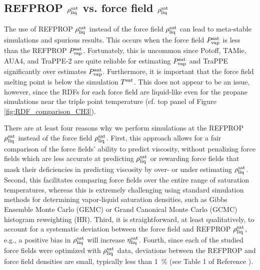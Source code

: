 \documentclass[preprint,review,12pt]{elsarticle}
\begin{document}
	\subsection{REFPROP $\rho_{\rm liq}^{\rm sat}$ vs. force field $\rho_{\rm liq}^{\rm sat}$}
	
	The use of REFPROP $\rho_{\rm liq}^{\rm sat}$ instead of the force field $\rho_{\rm liq}^{\rm sat}$ can lead to meta-stable simulations and spurious results. This occurs when the force field $P_{\rm vap}^{\rm sat}$ is less than the REFPROP $P_{\rm vap}^{\rm sat}$. Fortunately, this is uncommon since Potoff, TAMie, AUA4, and TraPPE-2 are quite reliable for estimating $P_{\rm vap}^{\rm sat}$ and TraPPE significantly over estimates $P_{\rm vap}^{\rm sat}$. Furthermore, it is important that the force field melting point is below the simulation $T^{\rm sat}$. This does not appear to be an issue, however, since the RDFs for each force field are liquid-like even for the propane simulations near the triple point temperature (cf. top panel of Figure \ref{fig:RDF_comparison_CH3}).
	
	
	There are at least four reasons why we perform simulations at the REFPROP $\rho_{\rm liq}^{\rm sat}$ instead of the force field $\rho_{\rm liq}^{\rm sat}$. First, this approach allows for a fair comparison of the force fields' ability to predict viscosity, without penalizing force fields which are less accurate at predicting $\rho_{\rm liq}^{\rm sat}$ or rewarding force fields that mask their deficiencies in predicting viscosity by over- or under estimating $\rho_{\rm liq}^{\rm sat}$.
	Second, this facilitates comparing force fields over the entire range of saturation temperatures, whereas this is extremely challenging using standard simulation methods for determining vapor-liquid saturation densities, such as Gibbs Ensemble Monte Carlo (GEMC) or Grand Canonical Monte Carlo (GCMC) histogram reweighting (HR). Third, it is straightforward, at least qualitatively, to account for a systematic deviation between the force field and REFPROP $\rho_{\rm liq}^{\rm sat}$, e.g., a positive bias in $\rho_{\rm liq}^{\rm sat}$ will increase $\eta_{\rm liq}^{\rm sat}$. Fourth, since each of the studied force fields were optimized with $\rho_{\rm liq}^{\rm sat}$ data, deviations between the REFPROP and force field densities are small, typically less than 1~\% (see Table 1 of Reference ). 
	
\end{document}
